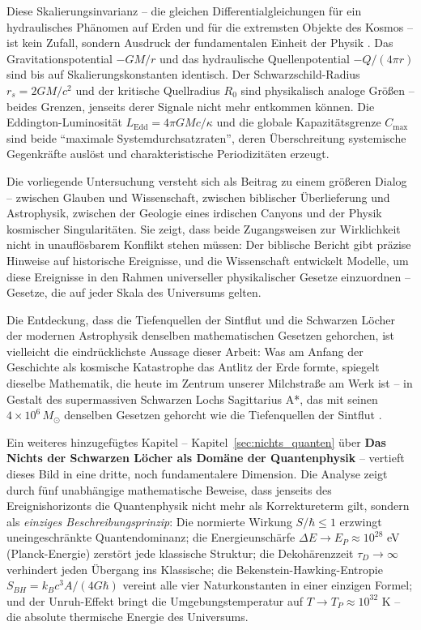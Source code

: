 ﻿\documentclass[12pt,a4paper]{report}
\begin{document}
Diese Skalierungsinvarianz -- die gleichen Differentialgleichungen für ein hydraulisches Phänomen auf Erden und für die extremsten Objekte des Kosmos -- ist kein Zufall, sondern Ausdruck der fundamentalen Einheit der Physik \cite{penrose2004,misner1973}. Das Gravitationspotential $-GM/r$ und das hydraulische Quellenpotential $-Q/(4\pi r)$ sind bis auf Skalierungskonstanten identisch. Der Schwarzschild-Radius $r_s = 2GM/c^2$ und der kritische Quellradius $R_0$ sind physikalisch analoge Größen -- beides Grenzen, jenseits derer Signale nicht mehr entkommen können. Die Eddington-Luminosität $L_{\mathrm{Edd}} = 4\pi GMc/\kappa$ und die globale Kapazitätsgrenze $C_{\max}$ sind beide "`maximale Systemdurchsatzraten"', deren Überschreitung systemische Gegenkräfte auslöst und charakteristische Periodizitäten erzeugt.

Die vorliegende Untersuchung versteht sich als Beitrag zu einem größeren Dialog -- zwischen Glauben und Wissenschaft, zwischen biblischer Überlieferung und Astrophysik, zwischen der Geologie eines irdischen Canyons und der Physik kosmischer Singularitäten. Sie zeigt, dass beide Zugangsweisen zur Wirklichkeit nicht in unauflösbarem Konflikt stehen müssen: Der biblische Bericht gibt präzise Hinweise auf historische Ereignisse, und die Wissenschaft entwickelt Modelle, um diese Ereignisse in den Rahmen universeller physikalischer Gesetze einzuordnen -- Gesetze, die auf jeder Skala des Universums gelten.

Die Entdeckung, dass die Tiefenquellen der Sintflut und die Schwarzen Löcher der modernen Astrophysik denselben mathematischen Gesetzen gehorchen, ist vielleicht die eindrücklichste Aussage dieser Arbeit: Was am Anfang der Geschichte als kosmische Katastrophe das Antlitz der Erde formte, spiegelt dieselbe Mathematik, die heute im Zentrum unserer Milchstraße am Werk ist -- in Gestalt des supermassiven Schwarzen Lochs Sagittarius A*, das mit seinen $4 \times 10^6\, M_\odot$ denselben Gesetzen gehorcht wie die Tiefenquellen der Sintflut \cite{kormendy2013}.

\medskip

Ein weiteres hinzugefügtes Kapitel -- Kapitel~\ref{sec:nichts_quanten} über \textbf{Das Nichts der Schwarzen Löcher als Domäne der Quantenphysik} -- vertieft dieses Bild in eine dritte, noch fundamentalere Dimension. Die Analyse zeigt durch fünf unabhängige mathematische Beweise, dass jenseits des Ereignishorizonts die Quantenphysik nicht mehr als Korrektureterm gilt, sondern als \emph{einziges Beschreibungsprinzip}: Die normierte Wirkung $S/\hbar \leq 1$ erzwingt uneingeschränkte Quantendominanz; die Energieunschärfe $\Delta E \to E_P \approx 10^{28}$ eV (Planck-Energie) zerstört jede klassische Struktur; die Dekohärenzzeit $\tau_D \to \infty$ verhindert jeden Übergang ins Klassische; die Bekenstein-Hawking-Entropie $S_{BH} = k_B c^3 A/(4G\hbar)$ vereint alle vier Naturkonstanten in einer einzigen Formel; und der Unruh-Effekt \cite{unruh1976} bringt die Umgebungstemperatur auf $T \to T_P \approx 10^{32}$ K -- die absolute thermische Energie des Universums.
\end{document}
